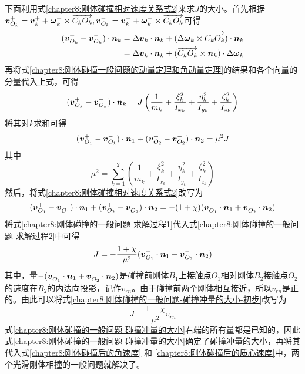 下面利用式\eqref{chapter8:刚体碰撞相对速度关系式2}来求$J$的大小。首先根据$\boldsymbol{v}_{O_k}^+=\boldsymbol{v}_k^++\boldsymbol{\omega}_k^+\times \overrightarrow{C_kO_k}, \boldsymbol{v}_{O_k}^-=\boldsymbol{v}_k^-+\boldsymbol{\omega}_k^-\times\overrightarrow{C_kO_k}$可得
\begin{align*}
	(\boldsymbol{v}_{O_k}^+-\boldsymbol{v}_{O_k}^-) \cdot \boldsymbol{n}_k & = \Delta\boldsymbol{v}_k \cdot \boldsymbol{n}_k + (\Delta\boldsymbol{\omega}_k\times \overrightarrow{C_kO_k})\cdot \boldsymbol{n}_k \\
	& = \Delta\boldsymbol{v}_k \cdot \boldsymbol{n}_k + (\overrightarrow{C_kO_k} \times \boldsymbol{n}_k)\cdot \Delta\boldsymbol{\omega}_k
\end{align*}
再将式\eqref{chapter8:刚体碰撞一般问题的动量定理和角动量定理}的结果和各个向量的分量代入上式，可得
\begin{equation*}
	(\boldsymbol{v}_{O_k}^+-\boldsymbol{v}_{O_k}^-) \cdot \boldsymbol{n}_k = J\left(\frac{1}{m_k}+\frac{\xi_k^2}{I_{x_k}}+\frac{\eta_k^2}{I_{y_k}}+\frac{\zeta_k^2}{I_{z_k}}\right)
\end{equation*}
将其对$k$求和可得
\begin{equation}
	(\boldsymbol{v}_{O_1}^+-\boldsymbol{v}_{O_1}^-) \cdot \boldsymbol{n}_1 + (\boldsymbol{v}_{O_2}^+-\boldsymbol{v}_{O_2}^-) \cdot \boldsymbol{n}_2 = \mu^2J
	\label{chapter8:刚体碰撞的一般问题-求解过程1}
\end{equation}
其中
\begin{equation}
	\mu^2 = \sum_{k=1}^2\left(\frac{1}{m_k}+\frac{\xi_k^2}{I_{x_k}}+\frac{\eta_k^2}{I_{y_k}}+\frac{\zeta_k^2}{I_{z_k}}\right)
	\label{chapter8:刚体碰撞的约化质量}
\end{equation}
然后，将式\eqref{chapter8:刚体碰撞相对速度关系式2}改写为
\begin{equation}
	(\boldsymbol{v}_{O_1}^+-\boldsymbol{v}_{O_1}^-) \cdot \boldsymbol{n}_1 + (\boldsymbol{v}_{O_2}^+-\boldsymbol{v}_{O_2}^-) \cdot \boldsymbol{n}_2 = -(1+\chi)(\boldsymbol{v}_{O_1}^-\cdot \boldsymbol{n}_1+\boldsymbol{v}_{O_2}^-\cdot \boldsymbol{n}_2)
	\label{chapter8:刚体碰撞的一般问题-求解过程2}
\end{equation}
将式\eqref{chapter8:刚体碰撞的一般问题-求解过程1}代入式\eqref{chapter8:刚体碰撞的一般问题-求解过程2}中可得
\begin{equation}
	J = -\frac{1+\chi}{\mu^2}(\boldsymbol{v}_{O_1}^-\cdot \boldsymbol{n}_1+\boldsymbol{v}_{O_2}^-\cdot \boldsymbol{n}_2)
	\label{chapter8:刚体碰撞的一般问题-碰撞冲量的大小-初步}
\end{equation}
其中，量$-(\boldsymbol{v}_{O_1}^-\cdot \boldsymbol{n}_1+\boldsymbol{v}_{O_2}^-\cdot \boldsymbol{n}_2)$是碰撞前刚体$B_1$上接触点$O_1$相对刚体$B_2$接触点$O_2$的速度在$B_2$的内法向投影，记作$v_{rn}$。由于碰撞前两个刚体相互接近，所以$v_{rn}$是正的。由此可以将式\eqref{chapter8:刚体碰撞的一般问题-碰撞冲量的大小-初步}改写为
\begin{equation}
	J = \frac{1+\chi}{\mu^2}v_{rn}
	\label{chapter8:刚体碰撞的一般问题-碰撞冲量的大小}
\end{equation}
式\eqref{chapter8:刚体碰撞的一般问题-碰撞冲量的大小}右端的所有量都是已知的，因此式\eqref{chapter8:刚体碰撞的一般问题-碰撞冲量的大小}确定了碰撞冲量的大小，再将其代入式\eqref{chapter8:刚体碰撞后的角速度} 和 \eqref{chapter8:刚体碰撞后的质心速度}中，两个光滑刚体相撞的一般问题就解决了。

